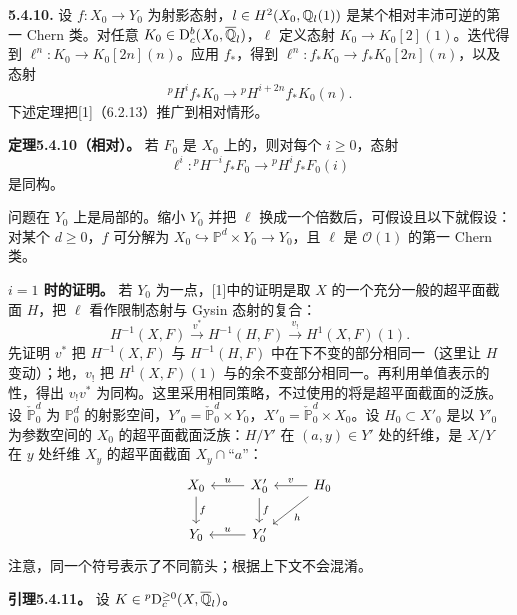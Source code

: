 \par\medskip\noindent\textbf{5.4.10.} 设 $f:X_0\to Y_0$ 为射影态射，$l\in H^2(X_0,\mathbb Q_l(1))$ 是某个相对丰沛可逆的第一 Chern 类。对任意 $K_0\in\mathrm{D}_c^b(X_0,\overline{\mathbb Q}_l)$，$\ell$ 定义态射 $K_0\to K_0[2](1)$。迭代得到 $\ell^n:K_0\to K_0[2n](n)$。应用 $f_*$，得到 $\ell^n:f_*K_0\to f_*K_0[2n](n)$，以及态射
\[
{}^pH^if_*K_0\longrightarrow{}^pH^{i+2n}f_*K_0(n).
\]
下述定理把[1]（6.2.13）推广到相对情形。

\par\medskip\noindent\textbf{定理5.4.10（相对）。} 若 $F_0$ 是 $X_0$ 上的，则对每个 $i\ge0$，态射
\[
\ell^i:{}^pH^{-i}f_*F_0\longrightarrow{}^pH^if_*F_0(i)
\]
是同构。

问题在 $Y_0$ 上是局部的。缩小 $Y_0$ 并把 $\ell$ 换成一个倍数后，可假设且以下就假设：对某个 $d\ge0$，$f$ 可分解为 $X_0\hookrightarrow\mathbb P^d\times Y_0\to Y_0$，且 $\ell$ 是 $\mathcal O(1)$ 的第一 Chern 类。

\par\noindent\textbf{$i=1$ 时的证明。} 若 $Y_0$ 为一点，[1]中的证明是取 $X$ 的一个充分一般的超平面截面 $H$，把 $\ell$ 看作限制态射与 Gysin 态射的复合：
\[
H^{-1}(X,F)\xrightarrow{v^*}H^{-1}(H,F)\xrightarrow{v_!}H^1(X,F)(1).
\]
先证明 $v^*$ 把 $H^{-1}(X,F)$ 与 $H^{-1}(H,F)$ 中在下不变的部分相同一（这里让 $H$ 变动）；地，$v_!$ 把 $H^1(X,F)(1)$ 与的余不变部分相同一。再利用单值表示的性，得出 $v_!v^*$ 为同构。这里采用相同策略，不过使用的将是超平面截面的泛族。
设 $\check{\mathbb P}_0^d$ 为 $\mathbb P_0^d$ 的射影空间，$Y'_0=\check{\mathbb P}_0^d\times Y_0$，$X'_0=\check{\mathbb P}_0^d\times X_0$。设 $H_0\subset X'_0$ 是以 $Y'_0$ 为参数空间的 $X_0$ 的超平面截面泛族：$H/Y'$ 在 $(a,y)\in Y'$ 处的纤维，是 $X/Y$ 在 $y$ 处纤维 $X_y$ 的超平面截面 $X_y\cap\text{“}a\text{”}$：
\[
\begin{tikzcd}[ampersand replacement=\&]
X_0\arrow[d,"{f}"]\&X'_0\arrow[l,"{u}"']\arrow[d,"{f}"]\&H_0\arrow[l,"{v}"']\arrow[dl,"{h}"]\\
Y_0\&Y'_0\arrow[l,"{u}"']\&{}
\end{tikzcd}
\]
注意，同一个符号表示了不同箭头；根据上下文不会混淆。

\par\medskip\noindent\textbf{引理5.4.11。} 设 $K\in{}^p\mathrm{D}_c^{\ge0}(X,\overline{\mathbb Q}_l)$。

